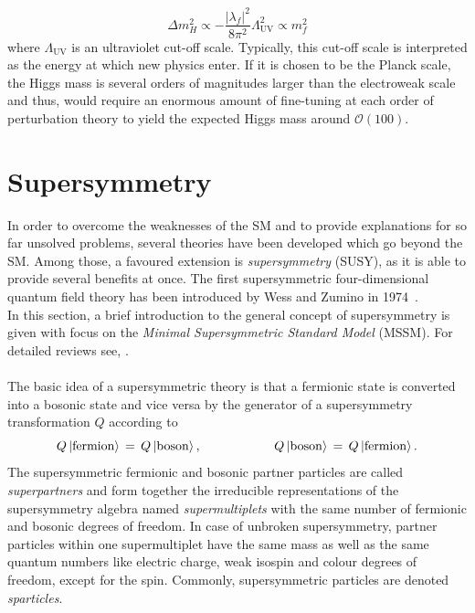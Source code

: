 \begin{description}
\begin{equation}
\label{eq:hierarchy}
\Delta m_H^2 \propto -\frac{|\lambda_f|^2}{8\pi^2}\Lambda_\mathrm{UV}^2 \propto m_f^2
\end{equation}
 where $\Lambda_\mathrm{UV}$ is an ultraviolet cut-off scale. Typically, this cut-off scale is interpreted as the energy at which new physics enter. If it is chosen to be the Planck scale, the Higgs mass is several orders of magnitudes larger than the electroweak scale and thus, would require an enormous amount of fine-tuning at each order of perturbation theory to yield the expected Higgs mass around $\mathcal{O}(100)$\gev. 
\end{description} 

\section{Supersymmetry}
\label{sec:susy}
In order to overcome the weaknesses of the SM and to provide explanations for so far unsolved problems, several theories have been developed which go beyond the SM. Among those, a favoured extension is \textit{supersymmetry} (SUSY), as it is able to provide several benefits at once. The first supersymmetric four-dimensional quantum field theory has been introduced by Wess and Zumino in 1974~\cite{bib:WessZumino}. \\
In this section, a brief introduction to the general concept of supersymmetry is given with focus on the \textit{Minimal Supersymmetric Standard Model} (MSSM). For detailed reviews see, \eg\cite{Aitchison:2005cf, Martin:1997ns}.\\ 
\\
The basic idea of a supersymmetric theory is that a fermionic state is converted into a bosonic state and vice versa by the generator of a supersymmetry transformation $Q$ according to
\begin{equation*}
Q \ket{\mathrm{fermion}} \, = \, Q \ket{\mathrm{boson}}, \hspace{20mm} Q \ket{\mathrm{boson}} \, = \, Q \ket{\mathrm{fermion}}.
\end{equation*}
The supersymmetric fermionic and bosonic partner particles are called \textit{superpartners} and form together the irreducible representations of the supersymmetry algebra named \textit{supermultiplets} with the same number of fermionic and bosonic degrees of freedom. In case of unbroken supersymmetry, partner particles within one supermultiplet have the same mass as well as the same quantum numbers like electric charge, weak isospin and colour degrees of freedom, except for the spin. Commonly, supersymmetric particles are denoted \textit{sparticles}. \\
